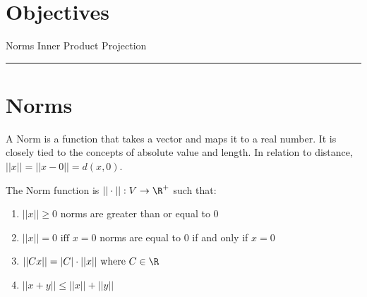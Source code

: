 
\section*{Objectives}
\begin{outline}
    \1 Norms
    \1 Inner Product
    \1 Projection
\end{outline}

\rule[0.0051in]{\textwidth}{0.00025in}
\section{Norms}

A Norm is a function that takes a vector and maps it to a real number. It is closely tied to the concepts of absolute value and length. In relation to distance, $||x|| = ||x - 0|| = d(x,0)$. 

The Norm function is $||\cdot|| : V \rightarrow \R^{+}$ such that:

\begin{enumerate}
	\item $||x|| \ge 0$    norms are greater than or equal to 0
	\item $||x|| = 0 \text{ iff } x = 0$    norms are equal to 0 if and only if $x = 0$
	\item $||Cx|| = |C| \cdot ||x|| \text{ where } C \in \R$
	\item $||x+y|| \leq ||x|| + ||y||$
\end{enumerate}


